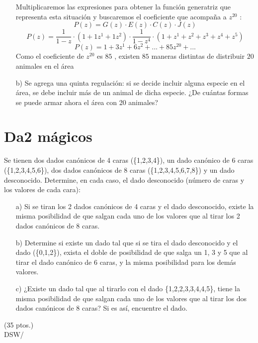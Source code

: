 \documentclass[spanish, fleqn]{article}
\begin{document}
\begin{enumerate}
    Multiplicaremos las expresiones para obtener la función generatriz que representa esta situación y buscaremos el coeficiente que acompaña a $z^{20}$ :
    $$P(z) = G(z) \cdot E(z) \cdot C(z) \cdot J(z)$$
    $$P(z) = \frac{1}{1-z} \cdot (1 + 1z^1 + 1z^2) \cdot \frac{1}{1-z^4} \cdot (1 + z^1 + z^2 + z^3 + z^4 + z^5)$$
    $$P(z) = 1 + 3z^1 + 6z^2 + ... + 85z^20 + ...$$
    Como el coeficiente de $z^20$ es $85$ , existen $85$ maneras distintas de distribuir $20$ animales en el área
    
    \item[b)] Se agrega una quinta regulación: si se decide incluir alguna especie en el área, se debe incluir más de un animal de dicha especie. ¿De cuántas formas se puede armar ahora el área con 20 animales?
    \end{enumerate}
    
    
	
	\section{Da2 mágicos}
    Se tienen dos dados canónicos de 4 caras (\{1,2,3,4\}), un dado canónico de 6 caras (\{1,2,3,4,5,6\}), dos dados canónicos de 8 caras (\{1,2,3,4,5,6,7,8\}) y un dado desconocido. Determine, en cada caso, el dado desconocido (número de caras y los valores de cada cara):
    \begin{itemize}
    \item[a)] Si se tiran los 2 dados canónicos de 4 caras y el dado desconocido, existe la misma posibilidad de que salgan cada uno de los valores que al tirar los 2 dados canónicos de 8 caras.
    \item[b)] Determine si existe un dado tal que si se tira el dado desconocido y el dado (\{0,1,2\}), exista el doble de posibilidad de que salga un 1, 3 y 5 que al tirar el dado canónico de 6 caras, y la misma posibilidad para los demás valores.
    \item[c)] ¿Existe un dado tal que al tirarlo con el dado \{1,2,2,3,3,4,4,5\}, tiene la misma posibilidad de que salgan cada uno de los valores que al tirar los dos dados canónicos de 8 caras? Si es así, encuentre el dado.
	\end{itemize}
    
	\hfill (35 ptos.)\\
	\vfill\hfill DSW/\LaTeXe
\end{document}
